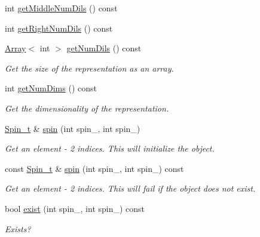 \begin{DoxyCompactItemize}
int \mbox{\hyperlink{classHadron_1_1HadronDistOperatorRep__t_ae196ed58711577cab052c88056654613}{get\+Middle\+Num\+Dils}} () const
\item 
int \mbox{\hyperlink{classHadron_1_1HadronDistOperatorRep__t_ae7f1a0e6b68e409027be775990dd2970}{get\+Right\+Num\+Dils}} () const
\item 
\mbox{\hyperlink{classXMLArray_1_1Array}{Array}}$<$ int $>$ \mbox{\hyperlink{classHadron_1_1HadronDistOperatorRep__t_af1ecef910eda615c9626072adc38e3e8}{get\+Num\+Dils}} () const
\begin{DoxyCompactList}\small\item\em Get the size of the representation as an array. \end{DoxyCompactList}\item 
int \mbox{\hyperlink{classHadron_1_1HadronDistOperatorRep__t_a19ee3c70f7ac127fbc534b0f69304b37}{get\+Num\+Dims}} () const
\begin{DoxyCompactList}\small\item\em Get the dimensionality of the representation. \end{DoxyCompactList}\item 
\mbox{\hyperlink{structHadron_1_1HadronDistOperatorRep__t_1_1Spin__t}{Spin\+\_\+t}} \& \mbox{\hyperlink{classHadron_1_1HadronDistOperatorRep__t_a654e35d182a22243a644b62836a5564d}{spin}} (int spin\+\_, int spin\+\_)
\begin{DoxyCompactList}\small\item\em Get an element -\/ 2 indices. This will initialize the object. \end{DoxyCompactList}\item 
const \mbox{\hyperlink{structHadron_1_1HadronDistOperatorRep__t_1_1Spin__t}{Spin\+\_\+t}} \& \mbox{\hyperlink{classHadron_1_1HadronDistOperatorRep__t_a6d2afd90c11aaf4fcbac9bd8091f61a2}{spin}} (int spin\+\_, int spin\+\_) const
\begin{DoxyCompactList}\small\item\em Get an element -\/ 2 indices. This will fail if the object does not exist. \end{DoxyCompactList}\item 
bool \mbox{\hyperlink{classHadron_1_1HadronDistOperatorRep__t_a4c133a0da748a0504683cfa5e711eeb6}{exist}} (int spin\+\_, int spin\+\_) const
\begin{DoxyCompactList}\small\item\em Exists? \end{DoxyCompactList}\item 

\end{DoxyCompactItemize}
